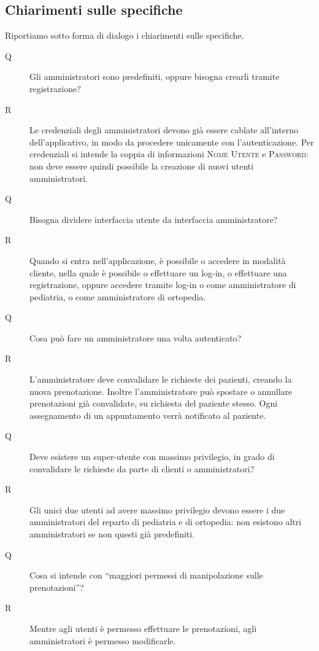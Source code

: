 \subsection{Chiarimenti sulle specifiche}\label{subsec:cssdc}
Riportiamo sotto forma di dialogo i chiarimenti sulle specifiche.

\begin{description}
\item[Q] Gli amministratori sono predefiniti, oppure bisogna crearli tramite registrazione?
\item[R] Le credenziali degli amministratori devono già essere cablate all'interno dell'applicativo, in modo da procedere unicamente con l'autenticazione. Per credenziali si intende la coppia di informazioni \textsc{Nome Utente} e \textsc{Password}: non deve essere quindi possibile la creazione di nuovi utenti amministratori.
\medskip

\item[Q] Bisogna dividere interfaccia utente da interfaccia amministratore?
\item[R] Quando si entra nell'applicazione, è possibile o accedere in modalità cliente, nella quale è possibile o effettuare un log-in, o effettuare una registrazione, oppure accedere tramite log-in o come amministratore di pediatria, o come amministratore di ortopedia.
\medskip

\item[Q] Cosa può fare un amministratore una volta autenticato?
\item[R] L'amministratore deve convalidare le richieste dei pazienti, creando la nuova prenotazione. Inoltre l'amministratore può spostare o annullare prenotazioni già convalidate, su richiesta del paziente stesso.
Ogni assegnamento di un appuntamento verrà notificato al paziente.
\medskip

\item[Q] Deve esistere un super-utente con massimo privilegio, in grado di convalidare le richieste da parte di clienti o amministratori?
\item[R] Gli unici due utenti ad avere massimo privilegio devono essere i due amministratori del reparto di pediatria e di ortopedia: non esistono altri amministratori se non questi già predefiniti. 
\medskip


\item[Q] Cosa si intende con ``maggiori permessi di manipolazione sulle prenotazioni''?
\item[R] Mentre agli utenti è permesso effettuare le prenotazioni, agli amministratori è permesso modificarle.
\medskip



\end{description}
